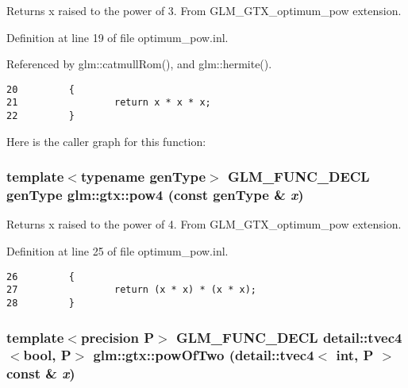 Returns x raised to the power of 3. From GLM\_\-GTX\_\-optimum\_\-pow extension. 

Definition at line 19 of file optimum\_\-pow.inl.

Referenced by glm::catmullRom(), and glm::hermite().

\begin{Code}\begin{verbatim}20         {
21                 return x * x * x;
22         }
\end{verbatim}
\end{Code}




Here is the caller graph for this function:\hypertarget{group__gtx__optimum__pow_g829e48dc50a8db13c225cef2aa618839}{
\subsubsection[pow4]{\setlength{\rightskip}{0pt plus 5cm}template$<$typename genType$>$ GLM\_\-FUNC\_\-DECL genType glm::gtx::pow4 (const genType \& {\em x})}}
\label{group__gtx__optimum__pow_g829e48dc50a8db13c225cef2aa618839}


Returns x raised to the power of 4. From GLM\_\-GTX\_\-optimum\_\-pow extension. 

Definition at line 25 of file optimum\_\-pow.inl.

\begin{Code}\begin{verbatim}26         {
27                 return (x * x) * (x * x);
28         }
\end{verbatim}
\end{Code}


\hypertarget{group__gtx__optimum__pow_g6b8d2e72de216fdb517d7bcc9323a713}{
\subsubsection[powOfTwo]{\setlength{\rightskip}{0pt plus 5cm}template$<$precision P$>$ GLM\_\-FUNC\_\-DECL detail::tvec4$<$bool, P$>$ glm::gtx::powOfTwo (detail::tvec4$<$ int, P $>$ const \& {\em x})}}
\label{group__gtx__optimum__pow_g6b8d2e72de216fdb517d7bcc9323a713}


